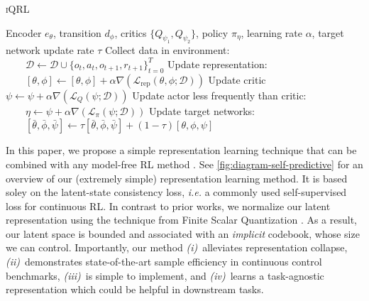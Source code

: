 \documentclass{article}
\makeatletter
\theoremstyle{plain}
\theoremstyle{definition}
\theoremstyle{remark}
\newcommand{\our}{\textsc{iQRL}\xspace}
\newcommand{\ie}{\textit{i.e.\@}\xspace}
\makeatother
\begin{document}
\begin{algorithm}[tb]
   \caption{\our}
   \label{alg:main_alg}
   \renewcommand{\algorithmiccomment}[1]{\hfill\textcolor{gray}{\(\triangleright\) #1}}
\begin{algorithmic}
    Encoder $e_{\theta}$, transition $d_{\phi}$, critics $\{Q_{\psi_{1}}, Q_{\psi_{2}} \}$, policy $\pi_{\eta}$, learning rate $\alpha$, target network update rate $\tau$
    \STATE Collect data in environment:
    \STATE $\qquad \mathcal{D} \leftarrow \mathcal{D} \cup \{o_{t}, a_{t}, o_{t+1}, r_{t+1}\}^{T}_{t=0}$
        \STATE Update representation:
        \STATE $\qquad [\theta, \phi] \leftarrow [\theta, \phi] + \alpha \nabla \left( \mathcal{L}_{\text{rep}}(\theta, \phi; \mathcal{D}) \right)$  
        \STATE Update critic
        \STATE \quad \quad $\psi \leftarrow \psi + \alpha \nabla \left( \mathcal{L}_{Q}(\psi; \mathcal{D}) \right)$ 
          \STATE Update actor less frequently than critic:
          \STATE $\quad \quad \eta \leftarrow \psi + \alpha \nabla \left( \mathcal{L}_{\pi}(\psi; \mathcal{D}) \right)$  
        \ENDIF
        \STATE Update target networks:
        \STATE $\quad \quad [\bar{\theta}, \bar{\phi}, \bar{\psi}] \leftarrow \tau [\bar{\theta}, \bar{\phi}, \bar{\psi}] + (1-\tau) [{\theta}, {\phi}, {\psi}]$
    \ENDFOR
   \ENDFOR
\end{algorithmic}
\end{algorithm}


In this paper, we propose a simple representation learning technique that can be combined with any model-free RL method
\citep[we use TD3][]{fujimotoAddressingFunctionApproximation2018}.
See \cref{fig:diagram-self-predictive} for an overview of our (extremely simple) representation learning method.
It is based soley on the latent-state consistency loss, \ie a commonly used self-supervised loss for continuous RL.
In contrast to prior works, we normalize our latent representation using the technique from Finite Scalar Quantization
\citep{mentzerFiniteScalarQuantization2023}.
As a result, our latent space is bounded and associated with an \emph{implicit} codebook, whose size we can control.
Importantly, our method {\em (i)}~alleviates representation collapse,
{\em (ii)}~demonstrates state-of-the-art sample efficiency in continuous control benchmarks,
{\em (iii)}~is simple to implement, and {\em (iv)}~learns a task-agnostic
representation which could be helpful in downstream tasks.
\end{document}
